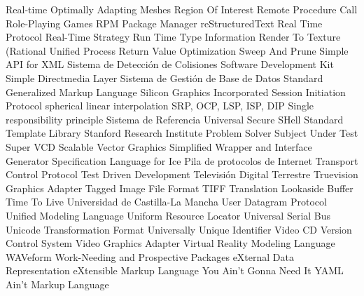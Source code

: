 {\begin{acronym}[XXXXXXXX]
   {Real-time Optimally Adapting Meshes}
    {Region Of Interest}
    {Remote Procedure Call}
    {Role-Playing Games}
    {\acs{RPM} Package Manager}
    {reStructuredText}
    {Real Time Protocol}
    {Real-Time Strategy}
   {Run Time Type Information}
    {Render To Texture}
    {(Rational Unified Process}
    {Return Value Optimization}
    {Sweep And Prune}
    {Simple \acs{API} for \acs{XML}}
    {Sistema de Detección de Colisiones}
    {Software Development Kit}
    {Simple Directmedia Layer} 
   {Sistema de Gestión de Base de Datos} 
   {Standard Generalized Markup Language}
    {Silicon Graphics Incorporated} 
    {Session Initiation Protocol}
  {spherical linear interpolation}
  {\acs{SRP}, \acs{OCP}, \acs{LSP}, \acs{ISP}, \acs{DIP}}
    {Single responsibility principle}
    {Sistema de Referencia Universal}
    {Secure SHell}
    {Standard Template Library}
 {Stanford Research Institute Problem Solver}
    {Subject Under Test}
   {Super \acs{VCD}} 
    {Scalable Vector Graphics} 
   {Simplified Wrapper and Interface Generator}
  {Specification Language for Ice}
 {Pila de protocolos de Internet}
    {Transport Control Protocol}
    {Test Driven Development}
    {Televisión Digital Terrestre}
    {Truevision Graphics Adapter}
   {Tagged Image File Format}
    {\acs{TIFF}}
    {Translation Lookaside Buffer}
    {Time To Live}
   {Universidad de Castilla-La Mancha}
    {User Datagram Protocol}
    {Unified Modeling Language}
    {Uniform Resource Locator} 
    {Universal Serial Bus}
    {Unicode Transformation Format} 
   {Universally Unique Identifier}
    {Video \acs{CD}} 
    {Version Control System}
    {Video Graphics Adapter}
   {Virtual Reality Modeling Language}
    {WAVeform}
   {Work-Needing and Prospective Packages}
    {eXternal Data Representation}
    {eXtensible Markup Language}
  {You Ain't Gonna Need It}
   {YAML Ain't Markup Language}
\end{acronym}}



